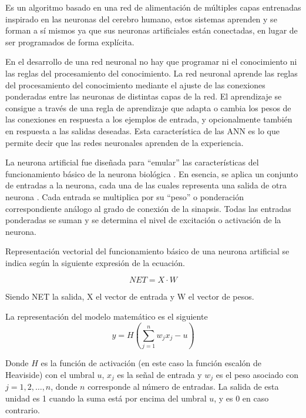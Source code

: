 Es un algoritmo basado en una red de alimentación de múltiples capas entrenadas inspirado en las neuronas del cerebro humano, estos sistemas aprenden y se forman a sí mismos ya que sus neuronas artificiales están conectadas, en lugar de ser programados de forma explícita\cite{herrera2020prediccion }.

\vspace{1\baselineskip}
En el desarrollo de una red neuronal no hay que programar ni el conocimiento ni las reglas del procesamiento del conocimiento. La red neuronal aprende las reglas del procesamiento del conocimiento mediante el ajuste de las conexiones ponderadas entre las neuronas de distintas capas de la red.
El aprendizaje se consigue a través de una regla de aprendizaje que adapta o cambia los pesos de las conexiones en respuesta a los ejemplos de entrada, y opcionalmente también en respuesta a las salidas deseadas. Esta característica de las ANN es lo que permite decir que las redes neuronales aprenden de la experiencia\cite{olabe1998redes}. 

\vspace{1\baselineskip}
La neurona artificial fue diseñada para “emular” las características del funcionamiento básico de la neurona biológica \cite{basogain2008redes}. En esencia, se aplica un conjunto de entradas a la neurona, cada una de las cuales representa una salida de otra neurona . Cada entrada se multiplica por su “peso” o ponderación correspondiente análogo al grado de conexión de la sinapsis. Todas las entradas ponderadas se suman y se determina el nivel de excitación o activación de la neurona.

Representación vectorial del funcionamiento básico de una neurona artificial se indica según la siguiente expresión de la ecuación.

\[
NET = X \cdot W
\]


Siendo NET la salida, X el vector de entrada y W el vector de pesos.

\vspace{1\baselineskip}
La representación del modelo matemático es el siguiente
\begin{equation}
  y = H\left(\sum_{j=1}^{n} w_jx_j - u\right)
  \end{equation}

Donde \(H\) es la función de activación (en este caso la función escalón de Heaviside) con el umbral \(u\), \(x_j\) es la señal de entrada y \(w_j\) es el peso asociado con \(j = 1,2,\ldots,n\), donde \(n\) corresponde al número de entradas. La salida de esta unidad es 1 cuando la suma está por encima del umbral \(u\), y es 0 en caso contrario\cite{arana2021redes}.

